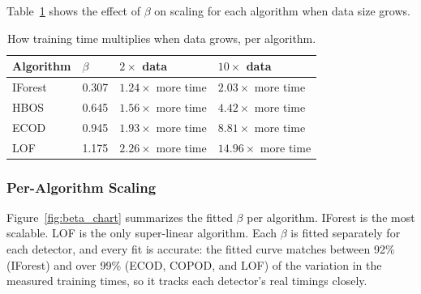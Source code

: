 \documentclass[12pt]{article}
\begin{document}
Table~\ref{tab:multipliers} shows the effect of $\beta$ on scaling for each algorithm when data size grows.

\begin{table}[H]
\begin{center}
\begin{tabular}{@{}llll@{}}
\toprule
Algorithm & $\beta$ & $2\times$ data & $10\times$ data \\
\midrule
IForest  & 0.307 & $1.24\times$ more time & $2.03\times$ more time \\
HBOS     & 0.645 & $1.56\times$ more time & $4.42\times$ more time \\
ECOD     & 0.945 & $1.93\times$ more time & $8.81\times$ more time \\
LOF      & 1.175 & $2.26\times$ more time & $14.96\times$ more time \\
\bottomrule
\end{tabular}
\end{center}
\caption{How training time multiplies when data grows, per algorithm.}
\label{tab:multipliers}
\end{table}

\subsubsection{Per-Algorithm Scaling}

Figure~\ref{fig:beta_chart} summarizes the fitted $\beta$ per algorithm. IForest is the most scalable. LOF is the only super-linear algorithm. Each $\beta$ is fitted separately for each detector, and every fit is accurate: the fitted curve matches between 92\% (IForest) and over 99\% (ECOD, COPOD, and LOF) of the variation in the measured training times, so it tracks each detector's real timings closely.
\end{document}
